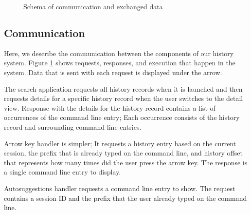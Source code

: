 \begin{figure}
\centering
{}
\caption{Schema of communication and exchanged data}
\label{design-api}
\end{figure}


\subsection{Communication}

Here, we describe the communication between the components of our history system. Figure \ref{design-api} shows requests, responses, and execution that happen in the system. Data that is sent with each request is displayed under the arrow. 

The search application requests all history records when it is launched and then requests details for a specific history record when the user switches to the detail view. Response with the details for the history record contains a list of occurrences of the command line entry; Each occurrence consists of the history record and surrounding command line entries.

Arrow key handler is simpler; It requests a history entry based on the current session, the prefix that is already typed on the command line, and history offset that represents how many times did the user press the arrow key. The response is a single command line entry to display.

Autosuggestions handler requests a command line entry to show. The request contains a session ID and the prefix that the user already typed on the command line.

